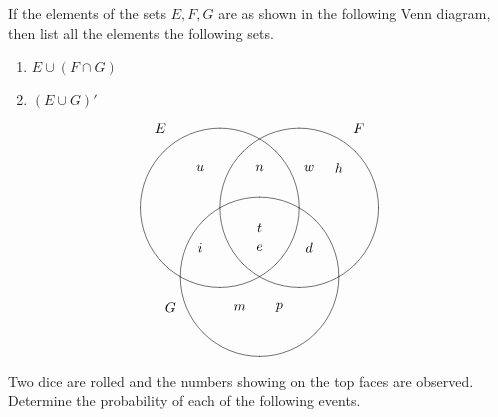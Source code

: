 \documentclass[answers,addpoints,12pt]{exam}
\begin{document}
\begin{questions}

\question[10] If the elements of the sets
$E,F,G$ are as shown in the following Venn diagram, then
list all the elements the following sets.
\begin{enumerate}
\item $E\cup\left(F\cap G\right)$
\item $\left(E\cup G\right)'$
\end{enumerate}
\[\begin{xy}<1cm,0cm>:
(-2.5,2)*{E};
(2.5,2)*{F};
(-2.25,-2.5)*{G};
(-1,0)*\cir<2cm>{};
(1,0)*\cir<2cm>{};
(0,-1.732)*\cir<2cm>{};
(-1.5,1)*{u};
(-1.5,-1)*{i};
(0,1)*{n};
(0,-.5)*{t};
(0,-1)*{e};
(1.25,1)*{w};
(1.25,-1)*{d};
(2,1)*{h};
(-.5,-2.5)*{m};
(.5,-2.5)*{p};
\end{xy}\]

\question[16] Two dice are rolled and the
numbers showing on the top faces are observed.
Determine the probability of each of the following events.
\begin{solution}
\end{solution}
\end{questions}
\end{document}
